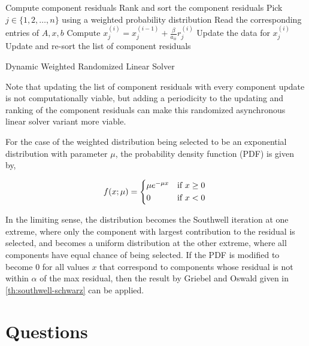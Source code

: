 \documentclass{article}
\theoremstyle{definition}
\theoremstyle{example}
\theoremstyle{example}
\theoremstyle{example}
\begin{document}
\begin{algorithm}[ht!]
	\DontPrintSemicolon
	Compute component residuals \;
	Rank and sort the component residuals \;
	 {
		 {
			Pick $j \in \{1, 2, \ldots, n\}$ using a weighted probability distribution \; \label{alg:pickrandom4}
			Read the corresponding entries of $A, x, b$ \label{step:read4}\;
			Compute $x^{(i)}_j = x^{(i-1)}_j + \frac{\beta}{a_{ii}} r^{(i)}_j$ \;
			Update the data for $x^{(i)}_j$ \;
			Update and re-sort the list of component residuals \label{step:dynamic-update} \;
		}
	}
	\caption{Dynamic Weighted Randomized Linear Solver}
	\label{algo:randomized-computational-model4}
\end{algorithm}

Note that updating the list of component residuals with every component update is not computationally viable, but adding a periodicity to the updating and ranking of the component residuals can make this randomized asynchronous linear solver variant more viable.

For the case of the weighted distribution being selected to be an exponential distribution with parameter $\mu$, the probability density function (PDF) is given by,

\begin{equation}
	\label{eq:exponential-pdf}
		f(x; \mu) =
		 \begin{cases*}
					\mu e^{-\mu x}	& if  $x \geq 0$  \\
								  0 & if $x < 0$
		 \end{cases*}
\end{equation}

In the limiting sense, the distribution becomes the Southwell iteration at one extreme, where only the component with largest contribution to the residual is selected, and becomes a uniform distribution at the other extreme, where all components have equal chance of being selected. If the PDF is modified to become 0 for all values $x$ that correspond to components whose residual is not within $\alpha$ of the max residual, then the result by Griebel and Oswald given in \cref{th:southwell-schwarz} can be applied.


%
\section{Questions}
\label{sect:summary-future-work}
\end{document}
